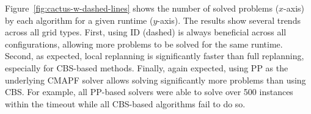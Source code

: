 \documentclass[letterpaper]{article} %
\def\
UrlFont{\rm}  %
\theoremstyle{definition}
\begin{document}


Figure~\ref{fig:cactus-w-dashed-lines} shows the number of solved problems  ($x$-axis) by each algorithm for a given runtime ($y$-axis). 
The results show several trends across all grid types. 
First, using ID (dashed) is always beneficial across all configurations, allowing more problems to be solved for the same runtime. Second, as expected, local replanning is significantly faster than full replanning, especially for CBS-based methods.  Finally, again expected, using PP as the underlying CMAPF solver allows solving significantly more problems than using CBS. For example, all PP-based solvers were able to solve over 500 instances within the timeout while all CBS-based algorithms fail to do so. 
\end{document}
